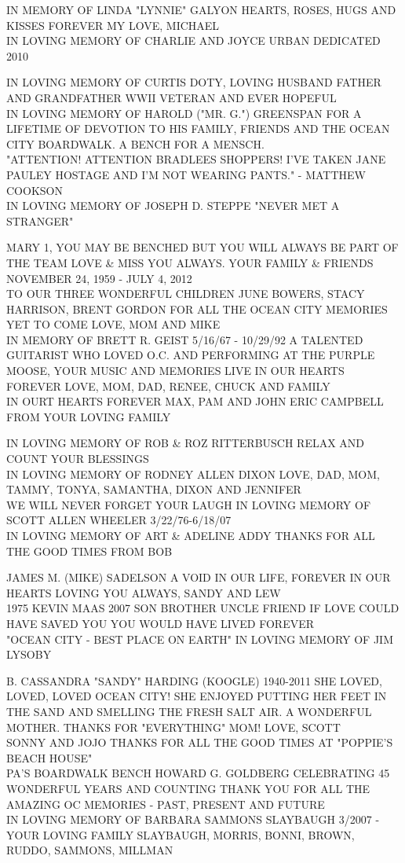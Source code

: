 \documentclass[10pt,letterpaper]{article}
\begin{document}
IN MEMORY OF LINDA "LYNNIE" GALYON HEARTS, ROSES, HUGS AND KISSES FOREVER MY LOVE, MICHAEL\\
IN LOVING MEMORY OF CHARLIE AND JOYCE URBAN DEDICATED 2010

IN LOVING MEMORY OF CURTIS DOTY, LOVING HUSBAND FATHER AND GRANDFATHER WWII VETERAN AND EVER HOPEFUL\\
IN LOVING MEMORY OF HAROLD ("MR. G.") GREENSPAN FOR A LIFETIME OF DEVOTION TO HIS FAMILY, FRIENDS AND THE OCEAN CITY BOARDWALK.  A BENCH FOR A MENSCH.\\
"ATTENTION!  ATTENTION BRADLEES SHOPPERS!  I'VE TAKEN JANE PAULEY HOSTAGE AND I'M NOT WEARING PANTS."  {-} MATTHEW COOKSON\\
IN LOVING MEMORY OF JOSEPH D. STEPPE "NEVER MET A STRANGER"

MARY 1, YOU MAY BE BENCHED BUT YOU WILL ALWAYS BE PART OF THE TEAM LOVE \& MISS YOU ALWAYS.  YOUR FAMILY \& FRIENDS NOVEMBER 24, 1959 {-} JULY 4, 2012\\
TO OUR THREE WONDERFUL CHILDREN JUNE BOWERS, STACY HARRISON, BRENT GORDON FOR ALL THE OCEAN CITY MEMORIES YET TO COME LOVE, MOM AND MIKE\\
IN MEMORY OF BRETT R. GEIST 5/16/67 {-} 10/29/92 A TALENTED GUITARIST WHO LOVED O.C. AND PERFORMING AT THE PURPLE MOOSE, YOUR MUSIC AND MEMORIES LIVE IN OUR HEARTS FOREVER LOVE, MOM, DAD, RENEE, CHUCK AND FAMILY\\
IN OURT HEARTS FOREVER MAX, PAM AND JOHN ERIC CAMPBELL FROM YOUR LOVING FAMILY

IN LOVING MEMORY OF ROB \& ROZ RITTERBUSCH RELAX AND COUNT YOUR BLESSINGS\\
IN LOVING MEMORY OF RODNEY ALLEN DIXON LOVE, DAD, MOM, TAMMY, TONYA, SAMANTHA, DIXON AND JENNIFER\\
WE WILL NEVER FORGET YOUR LAUGH IN LOVING MEMORY OF SCOTT ALLEN WHEELER 3/22/76{-}6/18/07\\
IN LOVING MEMORY OF ART \& ADELINE ADDY THANKS FOR ALL THE GOOD TIMES FROM BOB

JAMES M. (MIKE) SADELSON A VOID IN OUR LIFE, FOREVER IN OUR HEARTS LOVING YOU ALWAYS, SANDY AND LEW\\
1975 KEVIN MAAS 2007 SON BROTHER UNCLE FRIEND IF LOVE COULD HAVE SAVED YOU YOU WOULD HAVE LIVED FOREVER\\
"OCEAN CITY {-} BEST PLACE ON EARTH" IN LOVING MEMORY OF JIM LYSOBY

B. CASSANDRA "SANDY" HARDING (KOOGLE) 1940{-}2011 SHE LOVED, LOVED, LOVED OCEAN CITY!  SHE ENJOYED PUTTING HER FEET IN THE SAND AND SMELLING THE FRESH SALT AIR.  A WONDERFUL MOTHER.  THANKS FOR "EVERYTHING" MOM!  LOVE, SCOTT\\
SONNY AND JOJO THANKS FOR ALL THE GOOD TIMES AT "POPPIE'S BEACH HOUSE"\\
PA'S BOARDWALK BENCH HOWARD G. GOLDBERG CELEBRATING 45 WONDERFUL YEARS AND COUNTING THANK YOU FOR ALL THE AMAZING OC MEMORIES {-} PAST, PRESENT AND FUTURE\\
IN LOVING MEMORY OF BARBARA SAMMONS SLAYBAUGH 3/2007 {-} YOUR LOVING FAMILY SLAYBAUGH, MORRIS, BONNI, BROWN, RUDDO, SAMMONS, MILLMAN
\end{document}
